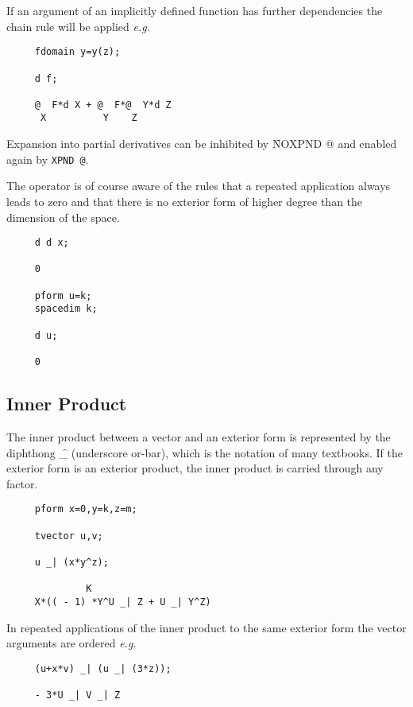 If an argument of an implicitly defined function has further
dependencies the chain rule will be applied \emph{e.g.} 


\begin{verbatim}
     fdomain y=y(z);

     d f;

     @  F*d X + @  F*@  Y*d Z
      X          Y    Z
\end{verbatim}

Expansion into partial derivatives can be inhibited by
\f{NOXPND @}\label{NOXPNDA}
and enabled again by \texttt{XPND @}\label{XPNDA}.
 

The operator is of course aware of the rules that a repeated
application always leads to zero and that there is no exterior form of
higher degree than the dimension of the space.

\begin{verbatim}
     d d x;

     0

     pform u=k;
     spacedim k;

     d u;

     0
\end{verbatim}
\subsection{Inner Product}
The inner product between a vector and an exterior form is represented
by the diphthong \f{\_\textbar} \label{innerp} (underscore or-bar), which is the
notation of many textbooks.  If the exterior form is an exterior
product, the inner product is carried through any factor.
\hypertarget{reserved:innerprodop}{}

\example{}

\begin{verbatim}
     pform x=0,y=k,z=m;

     tvector u,v;

     u _| (x*y^z);

              K
     X*(( - 1) *Y^U _| Z + U _| Y^Z)
\end{verbatim}

In repeated applications of the inner product to the same exterior
form the vector arguments are ordered \emph{e.g.}

\begin{verbatim}
     (u+x*v) _| (u _| (3*z));

     - 3*U _| V _| Z
\end{verbatim}

